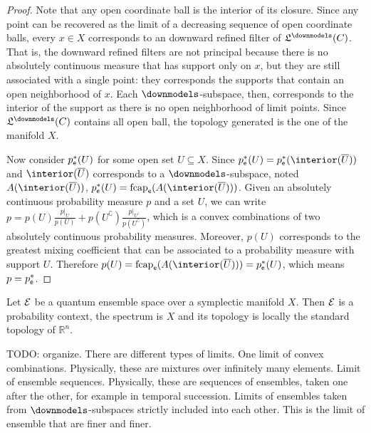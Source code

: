 \begin{proof}
	Note that any open coordinate ball is the interior of its closure. Since any point can be recovered as the limit of a decreasing sequence of open coordinate balls, every $x \in X$ corresponds to an downward refined filter of $\mathfrak{L}^\separate(C)$. That is, the downward refined filters are not principal because there is no absolutely continuous measure that has support only on $x$, but they are still associated with a single point: they corresponds the supports that contain an open neighborhood of $x$. Each $\separate$-subspace, then, corresponds to the interior of the support as there is no open neighborhood of limit points. Since $\mathfrak{L}^\separate(C)$ contains all open ball, the topology generated is the one of the manifold $X$.
	
	Now consider $p^*_{\mathsf{e}}(U)$ for some open set $U \subseteq X$. Since $p^*_{\ens}(U) = p^*_{\ens}(\interior(\overline{U}))$ and $\interior(\overline{U})$ corresponds to a $\separate$-subspace, noted $A(\interior(\overline{U}))$, $p^*_{\ens}(U) = \fcap_{\ens}(A(\interior(\overline{U})))$. Given an absolutely continuous probability measure $p$ and a set $U$, we can write $p = p(U) \frac{\left.p\right|_{U}}{p(U)} + p(U^{\complement}) \frac{\left.p\right|_{U^{\complement}}}{p(U^{\complement})}$, which is a convex combinations of two absolutely continuous probability measures. Moreover, $p(U)$ corresponds to the greatest mixing coefficient that can be associated to a probability measure with support $U$. Therefore $p(U) = \fcap_{\ens}(A(\interior(\overline{U}))) = p^*_{\ens}(U)$, which means $p = p^*_{\mathsf{e}}$.
\end{proof}

\begin{prop}
	Let $\mathcal{E}$ be a quantum ensemble space over a symplectic manifold $X$. Then $\mathcal{E}$ is a probability context, the spectrum is $X$ and its topology is locally the standard topology of $\mathbb{R}^n$.
\end{prop}


\begin{remark}
	TODO: organize. There are different types of limits. One limit of convex combinations. Physically, these are mixtures over infinitely many elements. Limit of ensemble sequences. Physically, these are sequences of ensembles, taken one after the other, for example in temporal succession. Limits of ensembles taken from $\separate$-subspaces strictly included into each other. This is the limit of ensemble that are finer and finer.
\end{remark}

